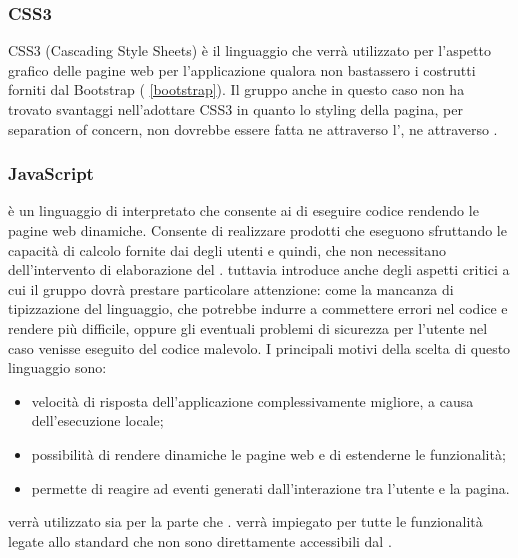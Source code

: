 \documentclass[12pt,a4paper]{article}
\begin{document}
\subsubsection{CSS3}\label{css}
CSS3 (Cascading Style Sheets) è il linguaggio che verrà utilizzato per l’aspetto grafico delle pagine web per l'applicazione qualora non bastassero i costrutti forniti dal  Bootstrap ( \ref{bootstrap}).
Il gruppo anche in questo caso non ha trovato svantaggi nell'adottare CSS3 in quanto lo styling della pagina, per separation of concern, non dovrebbe essere fatta ne attraverso l', ne attraverso .

\subsubsection{JavaScript}\label{javascript}
 è un linguaggio di  interpretato che consente ai  di eseguire codice rendendo le pagine web dinamiche. Consente di realizzare prodotti  che eseguono sfruttando le capacità di calcolo fornite dai  degli utenti e quindi, che non necessitano dell’intervento di elaborazione del .  tuttavia introduce anche degli aspetti critici a cui il gruppo dovrà prestare particolare attenzione: come la mancanza di tipizzazione del linguaggio, che potrebbe indurre a commettere errori nel codice e rendere più difficile, oppure gli eventuali problemi di sicurezza per l'utente nel caso venisse eseguito del codice malevolo. I principali motivi della scelta di questo linguaggio sono:

\begin{itemize}
	\item velocità di risposta dell’applicazione complessivamente migliore, a causa dell’esecuzione locale;
	\item possibilità di rendere dinamiche le pagine web e di estenderne le funzionalità;
	\item permette di reagire ad eventi generati dall’interazione tra l’utente e la pagina.
\end{itemize}

 verrà utilizzato sia per la parte  che .  verrà impiegato per tutte le funzionalità legate allo standard  che non sono direttamente accessibili dal  .
\end{document}
